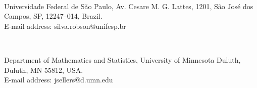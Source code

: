 \documentclass[12pt]{article}
\begin{document}
\

\noindent Universidade Federal de S\~ao Paulo, Av. Cesare M. G. Lattes, 1201, S\~ao Jos\'e dos Campos, SP, 12247--014, Brazil. \\
E-mail address: silva.robson@unifesp.br

\

\noindent Department of Mathematics and Statistics, University of Minnesota Duluth, Duluth, MN  55812, USA. \\
E-mail address: jsellers@d.umn.edu
\end{document}
